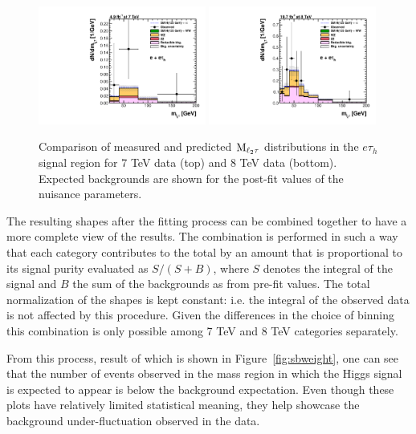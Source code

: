 \begin{figure}
\begin{center}
  \includegraphics[width=0.49\textwidth]{4_Analisys/pics/postfit/eet_postfit_7TeV_FitAllChannels.pdf}
  \includegraphics[width=0.49\textwidth]{4_Analisys/pics/postfit/eet_postfit_8TeV_FitAllChannels.pdf}\\
  \caption{Comparison of measured and predicted $\rm{M}_{\ell_2\tau}$ distributions in the $e\tau_h$ signal region for 7 TeV data (top) and 8 TeV data (bottom). 
    Expected backgrounds are shown for the post-fit values of the nuisance parameters. }
  \label{fig:LLT_eet_postfit}
\end{center}
\end{figure}

The resulting shapes after the fitting process can be combined together to have a more complete view of the results. The combination is performed in such a way that each category contributes to the total by an amount that is proportional to its signal purity evaluated as $S / (S+B)$, where $S$ denotes the integral of the signal and $B$ the sum of the backgrounds as from pre-fit values. The total normalization of the shapes is kept constant: i.e. the integral of the observed data is not affected by this procedure. Given the differences in the choice of binning this combination is only possible among 7 TeV and 8 TeV categories separately. 

From this process, result of which is shown in Figure~\ref{fig:sbweight}, one can see that the number of events observed in the mass region in which the Higgs signal is expected to appear is below the background expectation. %
Even though these plots have relatively limited statistical meaning, they help showcase the background under-fluctuation observed in the data.

